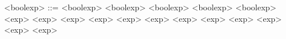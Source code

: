 \begin{grammarEx}
	<bool\textunderscore exp> ::= <bool\textunderscore exp> \lit{\opand} <bool\textunderscore exp>
	\alt <bool\textunderscore exp> \lit{\opor} <bool\textunderscore exp>
	\alt \lit{\opneg} <bool\textunderscore exp>
	\alt <exp> \lit{\opless{}} <exp>
	\alt <exp> \lit{\opgreater{}} <exp>
	\alt <exp> \lit{\oplesseq{}} <exp>
	\alt <exp> \lit{\opgreatereq{}} <exp>
	\alt <exp> \lit{\opeq{}} <exp>
	\alt <exp> \lit{\opuneq{}} <exp>
	\alt {}
	\alt {}
\end{grammarEx}